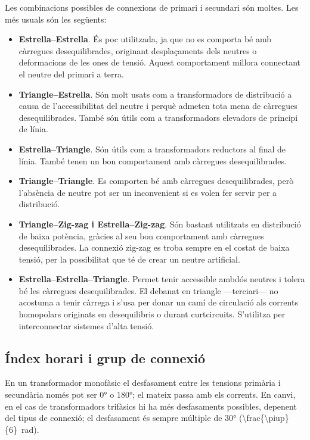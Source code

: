 Les combinacions possibles de connexions de primari i secundari són moltes. Les més usuals són les següents:
\begin{itemize}
   \item \textbf{Estrella--Estrella}. És poc utilitzada, ja que no es comporta bé amb càrregues desequilibrades, originant desplaçaments dels neutres o deformacions de les ones de tensió. Aquest comportament millora connectant el neutre del primari a terra. 
   \item \textbf{Triangle--Estrella}. Són molt usats com a transformadors de distribució a causa de l'accessibilitat del neutre i perquè admeten tota mena de càrregues desequilibrades. També són útils com a transformadors elevadors de principi de línia.
   \item \textbf{Estrella--Triangle}. Són útils com a transformadors reductors al final de línia. També tenen un bon comportament  amb càrregues desequilibrades.
   \item \textbf{Triangle--Triangle}. Es comporten bé amb càrregues desequilibrades, però l'absència de neutre pot ser un inconvenient si es volen fer servir per a distribució.
   \item \textbf{Triangle--Zig-zag i Estrella--Zig-zag}. Són bastant utilitzats en distribució de baixa potència, gràcies al seu bon comportament amb càrregues desequilibrades. La connexió zig-zag es troba sempre en el costat de baixa tensió, per la possibilitat que té de crear un neutre artificial.
   \item \textbf{Estrella--Estrella--Triangle}. Permet tenir accessible ambdós  neutres i tolera  bé les càrregues  desequilibrades. El debanat en triangle ---terciari--- no acostuma a tenir càrrega i s'usa per donar un camí de circulació als corrents homopolars originats en desequilibris o durant curtcircuits. S'utilitza per interconnectar sistemes d'alta tensió.
\end{itemize}


\subsection{Índex horari i grup de connexió}\label{sec:connex-index-horari}

En un transformador monofàsic el desfasament entre les tensions primària i secundària només pot ser \ang{0} o \ang{180}; el mateix passa amb els corrents. En canvi, en el cas de transformadors trifàsics hi ha més desfasaments possibles, depenent del tipus de connexió; el desfasament és sempre múltiple de \ang{30} 
(\qty[parse-numbers=false]{\frac{\piup}{6}}{rad}).

